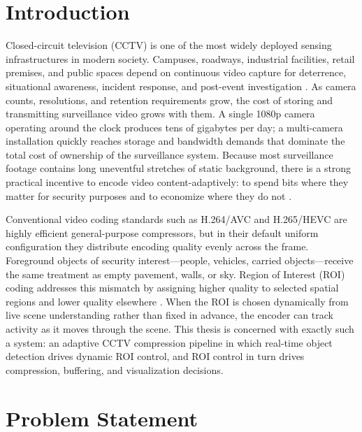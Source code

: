 \section{Introduction}

Closed-circuit television (CCTV) is one of the most widely deployed sensing infrastructures in modern society. Campuses, roadways, industrial facilities, retail premises, and public spaces depend on continuous video capture for deterrence, situational awareness, incident response, and post-event investigation \cite{Shao2018Smart,Chen2019DIVS}. As camera counts, resolutions, and retention requirements grow, the cost of storing and transmitting surveillance video grows with them. A single 1080p camera operating around the clock produces tens of gigabytes per day; a multi-camera installation quickly reaches storage and bandwidth demands that dominate the total cost of ownership of the surveillance system. Because most surveillance footage contains long uneventful stretches of static background, there is a strong practical incentive to encode video content-adaptively: to spend bits where they matter for security purposes and to economize where they do not \cite{Xiao2017Sensitive,Wu2020FGBG}.

Conventional video coding standards such as H.264/AVC \cite{Wiegand2003H264} and H.265/HEVC \cite{Sullivan2012HEVC} are highly efficient general-purpose compressors, but in their default uniform configuration they distribute encoding quality evenly across the frame. Foreground objects of security interest---people, vehicles, carried objects---receive the same treatment as empty pavement, walls, or sky. Region of Interest (ROI) coding addresses this mismatch by assigning higher quality to selected spatial regions and lower quality elsewhere \cite{Huang2009MultiPriority,Xue2016FastROI}. When the ROI is chosen dynamically from live scene understanding rather than fixed in advance, the encoder can track activity as it moves through the scene. This thesis is concerned with exactly such a system: an adaptive CCTV compression pipeline in which real-time object detection drives dynamic ROI control, and ROI control in turn drives compression, buffering, and visualization decisions.

\section{Problem Statement}

